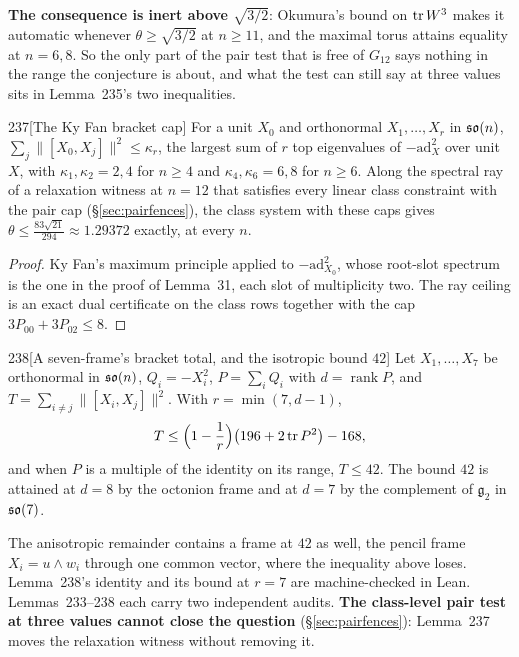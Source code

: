 \textbf{The consequence is inert above $\sqrt{3/2}$}: Okumura's bound on $\operatorname{tr} W^3$ makes it automatic whenever $\theta\ge\sqrt{3/2}$ at $n\ge11$, and the maximal torus attains equality at $n=6,8$. So the only part of the pair test that is free of $G_{12}$ says nothing in the range the conjecture is about, and what the test can still say at three values sits in Lemma~235's two inequalities.

\begin{Lem}{237}[The Ky Fan bracket cap]
For a unit $X_0$ and orthonormal $X_1,\dots,X_r$ in $\mathfrak{so}(n)$, $\sum_j\lVert[X_0,X_j]\rVert^2\le\kappa_r$, the largest sum of $r$ top eigenvalues of $-\mathrm{ad}_X^2$ over unit $X$, with $\kappa_1,\kappa_2=2,4$ for $n\ge4$ and $\kappa_4,\kappa_6=6,8$ for $n\ge6$. Along the spectral ray of a relaxation witness at $n=12$ that satisfies every linear class constraint with the pair cap (\S\ref{sec:pairfences}), the class system with these caps gives $\theta\le\frac{83\sqrt{21}}{294}\approx1.29372$ exactly, at every $n$.
\end{Lem}

\begin{proof}
Ky Fan's maximum principle applied to $-\mathrm{ad}_{X_0}^2$, whose root-slot spectrum is the one in the proof of Lemma~31, each slot of multiplicity two. The ray ceiling is an exact dual certificate on the class rows together with the cap $3P_{00}+3P_{02}\le8$.
\end{proof}

\begin{Lem}{238}[A seven-frame's bracket total, and the isotropic bound $42$]
Let $X_1,\dots,X_7$ be orthonormal in $\mathfrak{so}(n)$, $Q_i=-X_i^2$, $P=\sum_iQ_i$ with $d=\operatorname{rank}P$, and $T=\sum_{i\ne j}\lVert[X_i,X_j]\rVert^2$. With $r=\min(7,d-1)$,
\[
T\le\Big(1-\frac1r\Big)\big(196+2\operatorname{tr} P^2\big)-168,
\]
and when $P$ is a multiple of the identity on its range, $T\le42$. The bound $42$ is attained at $d=8$ by the octonion frame and at $d=7$ by the complement of $\mathfrak g_2$ in $\mathfrak{so}(7)$.
\end{Lem}

The anisotropic remainder contains a frame at $42$ as well, the pencil frame $X_i=u\wedge w_i$ through one common vector, where the inequality above loses. Lemma~238's identity and its bound at $r=7$ are machine-checked in Lean. Lemmas~233--238 each carry two independent audits. \textbf{The class-level pair test at three values cannot close the question} (\S\ref{sec:pairfences}): Lemma~237 moves the relaxation witness without removing it.


